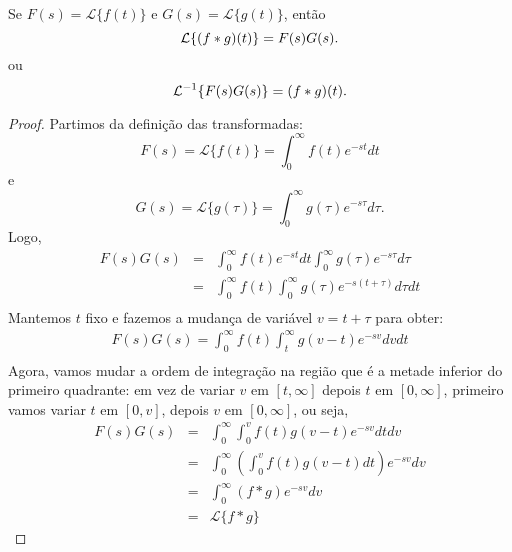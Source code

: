 \begin{prop}{\label{prop_conv}}Se $F(s)=\mathcal{L}\{f(t)\}$ e $G(s)=\mathcal{L}\{g(t)\}$, então
\begin{equation}{\label{eq_prop_conv}}
 \mathcal{L}\{(f*g)(t)\}=F(s)G(s).
\end{equation}
ou
\begin{equation}{\label{eq_inv_prop_conv}}
 \mathcal{L}^{-1}\{F(s)G(s)\}=(f*g)(t).
\end{equation}
\end{prop}
\begin{proof}Partimos da definição das transformadas:
$$
F(s)=\mathcal{L}\{f(t) \}=\int_0^\infty f(t)e^{-st}dt
$$
e
$$
G(s)=\mathcal{L}\{g(\tau) \}=\int_0^\infty g(\tau)e^{-s\tau}d\tau.
$$
Logo,
\begin{eqnarray*}
 F(s)G(s)&=&\int_0^\infty f(t)e^{-st}dt\int_0^\infty g(\tau)e^{-s\tau}d\tau\\
&=&\int_0^\infty f(t) \int_0^\infty g(\tau)e^{-s(t+\tau)} d\tau dt\\
\end{eqnarray*}
Mantemos $t$ fixo e fazemos a mudança de variável $v=t+\tau$ para obter:
\begin{eqnarray*}
 F(s)G(s)=\int_0^\infty f(t) \int_t^\infty g(v-t)e^{-sv}dv dt\\
\end{eqnarray*}
Agora, vamos mudar a ordem de integração na região que é a metade inferior do primeiro quadrante: em vez de variar $v$ em $[t,\infty]$ depois $t$ em $[0,\infty]$, primeiro vamos variar $t$ em $[0,v]$, depois $v$ em $[0,\infty]$, ou seja,
\begin{eqnarray*}
 F(s)G(s)&=&\int_0^\infty  \int_0^v f(t) g(v-t)e^{-sv} dt dv\\
 &=&\int_0^\infty \left( \int_0^v f(t) g(v-t)dt\right)e^{-sv}  dv\\
 &=&\int_0^\infty (f*g)e^{-sv}  dv\\
   &=&\mathcal{L}\{f*g\}
\end{eqnarray*}
\end{proof}

